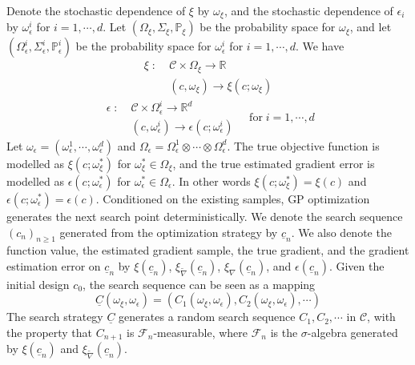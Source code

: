 \documentclass[a4paper,onecolumn]{article}
\theoremstyle{remark}
\begin{document}
Denote the stochastic dependence of $\xi$ by $\omega_\xi$, and the stochastic dependence of 
$\epsilon_i$ by $\omega_\epsilon^i$ for $i=1,\cdots, d$.
Let $(\Omega_\xi, \Sigma_\xi, \mathbb{P}_\xi)$ be the probability space for $\omega_\xi$, and let
 $(\Omega_\epsilon^i, \Sigma_\epsilon^i, \mathbb{P}_\epsilon^i)$ be the probability space for $\omega_\epsilon^i$ for
$i=1,\cdots,d$.
We have
\begin{equation}\begin{split}
    \xi\; : \; & \mathcal{C} \times \Omega_\xi \rightarrow \mathbb{R}\\
               & (c, \omega_\xi) \rightarrow \xi(c; \omega_\xi)
\end{split}\end{equation}
\begin{equation}\left.\begin{split}
    \epsilon \; :\; & \mathcal{C} \times \Omega_\epsilon^i \rightarrow \mathbb{R}^d \\
                    & (c, \omega_\epsilon^i) \rightarrow \epsilon(c; \omega_\epsilon^i)
\end{split}\right.
\quad \textrm{for}\; i=1,\cdots, d
\end{equation}
Let $\omega_\epsilon=(\omega_\epsilon^1,\cdots, \omega_\epsilon^d)$ and $\Omega_\epsilon =\Omega_\epsilon^1\otimes \cdots
\otimes \Omega_\epsilon^d$.
The true objective function is modelled as $\xi(c; \omega_\xi^*)$ for $\omega_\xi^*\in \Omega_\xi$, and
the true estimated gradient error is modelled as $\epsilon(c;\omega_\epsilon^*)$ for $\omega_\epsilon^* \in \Omega_\epsilon$.
In other words $\xi(c;\omega_\xi^*) = \xi(c)$ and $\epsilon(c;\omega_\epsilon^*)=\epsilon(c)$.
Conditioned on the existing samples, GP optimization generates the next search point deterministically.
We denote the search sequence
$(c_n)_{n\ge 1}$ generated from the optimization strategy by $\underline{c}_n$.
We also denote the function value, the estimated gradient sample, the true gradient, 
and the gradient estimation error on $\underline{c}_n$ by
$\xi(\underline{c}_n)$, $\xi_{\tilde{\nabla}}(\underline{c}_n)$, $\xi_\nabla(\underline{c}_n)$,
and $\epsilon(\underline{c}_n)$.
Given the initial design $c_0$, the search sequence can be seen as a mapping
\begin{equation}
     \underline{C}(\omega_\xi, \omega_\epsilon) = \left(C_1(\omega_\xi, \omega_\epsilon),
     C_2(\omega_\xi, \omega_\epsilon), \cdots\right)
\end{equation}
The search strategy $\underline{C}$ generates a random search sequence $C_1, C_2, \cdots$ 
in $\mathcal{C}$,
with the property that $C_{n+1}$ is $\mathcal{F}_n$-measurable, where 
$\mathcal{F}_n$ is the $\sigma$-algebra generated by
$\xi(\underline{c}_n)$ and $\xi_{\tilde{\nabla}}(\underline{c}_n)$.\\
\end{document}
